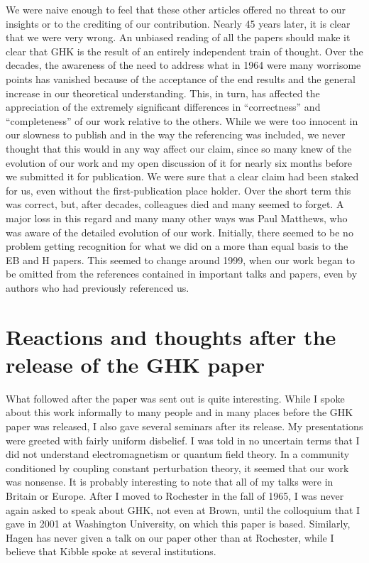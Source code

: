 \documentclass[12pt]{article}
\begin{document}
We were naive enough to feel that these other articles offered no threat to our
insights or to the crediting of our contribution. Nearly 45 years later, it is
clear that we were very wrong.  An unbiased reading of all the papers should
make it clear that GHK is the result of an entirely independent train of
thought. Over the decades, the awareness of the need to address what in 1964
were many worrisome points has vanished because of the acceptance of the end
results and the general increase in our theoretical understanding. This, in
turn, has affected the appreciation of the extremely significant differences in
``correctness'' and ``completeness'' of our work relative to the others. While we were
too innocent in our slowness to publish and in the way the referencing was
included, we never thought that this would in any way affect our
claim, since so many knew of the evolution of our work and my open discussion
of it for nearly six months before we submitted it for publication.  We were
sure that a clear claim had been staked for us, even without the
first-publication place holder. Over the short term this was correct, but,
after decades, colleagues died and many seemed to forget.  A major loss in this
regard and many many other ways was Paul Matthews, who was aware of the
detailed evolution of our work. Initially, there seemed to be no problem
getting recognition for what we did on a more than equal basis to the EB and H
papers. This seemed to change around 1999, when our work began to be omitted
from the references contained in important talks and papers, even by authors
who had previously referenced us.


   \section{Reactions and thoughts after the release of the GHK
     paper} \label{sec:8}

   What followed after the paper was sent out is quite
   interesting. While I spoke about this work informally to many
   people and in many places before the GHK paper was released, I also
   gave several seminars after its release. My presentations were
   greeted with fairly uniform disbelief. I was told in no uncertain
   terms that I did not understand electromagnetism or quantum field
   theory. In a community conditioned by coupling constant
   perturbation theory, it seemed that our work was nonsense. It is
   probably interesting to note that all of my talks were in Britain
   or Europe. After I moved to Rochester in the fall of 1965, I was
   never again asked to speak about GHK, not even at Brown, until the
   colloquium that I gave in 2001 at Washington University, on which
   this paper is based. Similarly, Hagen has never given a talk on our
   paper other than at Rochester, while I believe that Kibble spoke at
   several institutions.
\end{document}
